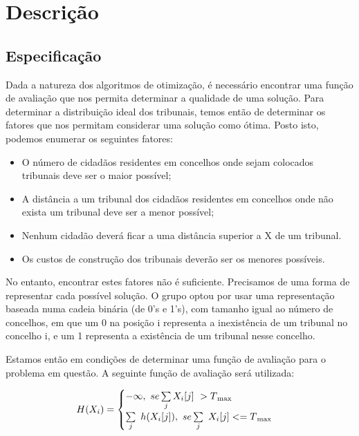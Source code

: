 \documentclass[11pt,a4paper,reqno]{article}
\numberwithin{equation}{section}
\begin{document}

\newpage

\section{Descrição} 
\subsection{Especificação} \label{introduction}

Dada a natureza dos algoritmos de otimização, é necessário encontrar uma função de avaliação que nos permita determinar a qualidade de uma solução. Para determinar a distribuição ideal dos tribunais, temos então de determinar os fatores que nos permitam considerar uma solução como ótima. Posto isto, podemos enumerar os seguintes fatores:

\begin{itemize}
\item O número de cidadãos residentes em concelhos onde sejam colocados tribunais deve ser o maior possível;
\item A distância a um tribunal dos cidadãos residentes em concelhos onde não exista um tribunal deve ser a menor possível;
\item Nenhum cidadão deverá ficar a uma distância superior a X de um tribunal.
\item Os custos de construção dos tribunais deverão ser os menores possíveis.
\end{itemize}

No entanto, encontrar estes fatores não é suficiente. Precisamos de uma forma de representar cada possível solução. O grupo optou por usar uma representação baseada numa cadeia binária (de 0's e 1's), com tamanho igual ao número de concelhos, em que um 0 na posição i representa a inexistência de um tribunal no concelho i, e um 1 representa a existência de um tribunal nesse concelho.

Estamos então em condições de determinar uma função de avaliação para o problema em questão. A seguinte função de avaliação será utilizada:

\begin{equation}
    H(X_i) = \begin{cases}
    -\infty ,\ se \sum\limits_{j}X_i[j]\ > T\textsubscript{max} \\
    \sum\limits_{j}\ h(X_i[j]), \ se \sum\limits_{j}\ X_i[j] <= T\textsubscript{max}\\
    \end{cases}
\end{equation}
\end{document}

